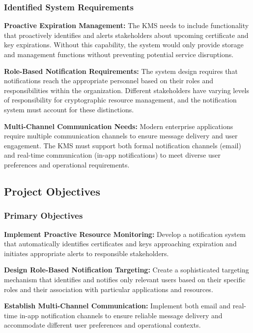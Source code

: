 \subsubsection{Identified System Requirements}

\textbf{Proactive Expiration Management:} The KMS needs to include functionality that proactively identifies and alerts stakeholders about upcoming certificate and key expirations. Without this capability, the system would only provide storage and management functions without preventing potential service disruptions.

\textbf{Role-Based Notification Requirements:} The system design requires that notifications reach the appropriate personnel based on their roles and responsibilities within the organization. Different stakeholders have varying levels of responsibility for cryptographic resource management, and the notification system must account for these distinctions.

\textbf{Multi-Channel Communication Needs:} Modern enterprise applications require multiple communication channels to ensure message delivery and user engagement. The KMS must support both formal notification channels (email) and real-time communication (in-app notifications) to meet diverse user preferences and operational requirements.

\subsection{Project Objectives}

\subsubsection{Primary Objectives}

\textbf{Implement Proactive Resource Monitoring:} Develop a notification system that automatically identifies certificates and keys approaching expiration and initiates appropriate alerts to responsible stakeholders.

\textbf{Design Role-Based Notification Targeting:} Create a sophisticated targeting mechanism that identifies and notifies only relevant users based on their specific roles and their association with particular applications and resources.

\textbf{Establish Multi-Channel Communication:} Implement both email and real-time in-app notification channels to ensure reliable message delivery and accommodate different user preferences and operational contexts.


